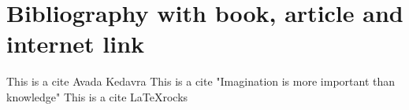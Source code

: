 \section{ Bibliography with book, article and internet link}
This is a cite \cite{harry} Avada Kedavra
This is a cite \cite{einstein} "Imagination is more important than knowledge"
This is a cite \cite{knuthwebsite} \LaTeX rocks
\printbibliography